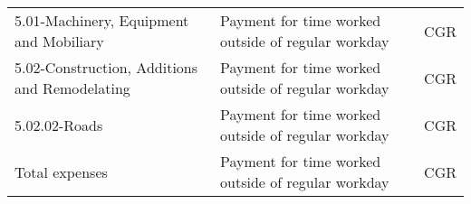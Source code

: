 \begin{table}[ht]
\begin{adjustbox}{max width=\textwidth}
\begin{tabular}{l l l}
5.01-Machinery, Equipment and Mobiliary& Payment for time worked outside of regular workday & CGR\\
5.02-Construction, Additions and Remodelating & Payment for time worked outside of regular workday & CGR\\
5.02.02-Roads& Payment for time worked outside of regular workday & CGR\\
Total expenses& Payment for time worked outside of regular workday & CGR\\
\hline
\hline
\end{tabular}
\end{adjustbox}
\label{table:expenditures}
\end{table}

